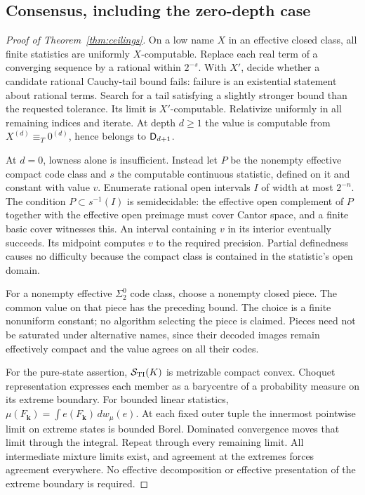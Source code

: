 \subsection{Consensus, including the zero-depth case}
\begin{proof}[Proof of Theorem~\ref{thm:ceilings}]
On a low name $X$ in an effective closed class, all finite statistics
are uniformly $X$-computable. Replace each real term of a converging
sequence by a rational within $2^{-s}$. With $X'$, decide whether a
candidate rational Cauchy-tail bound fails: failure is an existential
statement about rational terms. Search for a tail satisfying a
slightly stronger bound than the requested tolerance. Its limit is
$X'$-computable. Relativize uniformly in all remaining indices and
iterate. At depth $d\geq1$ the value is computable from
$X^{(d)}\equiv_T0^{(d)}$, hence belongs to $\mathsf D_{d+1}$.

At $d=0$, lowness alone is insufficient. Instead let $P$ be the
nonempty effective compact code class and $s$ the computable
continuous statistic, defined on it and constant with value $v$.
Enumerate rational open intervals $I$ of width at most $2^{-n}$.
The condition $P\subset s^{-1}(I)$ is semidecidable: the effective
open complement of $P$ together with the effective open preimage
must cover Cantor space, and a finite basic cover witnesses this.
An interval containing $v$ in its interior eventually succeeds.
Its midpoint computes $v$ to the required precision. Partial
definedness causes no difficulty because the compact class is
contained in the statistic's open domain.

For a nonempty effective $\Sigma^0_2$ code class, choose a nonempty
closed piece. The common value on that piece has the preceding
bound. The choice is a finite nonuniform constant; no algorithm
selecting the piece is claimed. Pieces need not be saturated under
alternative names, since their decoded images remain effectively
compact and the value agrees on all their codes.

For the pure-state assertion, $\mathcal S_{\rm TI}(K)$ is metrizable compact
convex. Choquet representation \cite{choquet} expresses each
member as a barycentre of a probability measure on its extreme
boundary. For bounded linear statistics,
$\mu(F_{\mathbf k})=\int e(F_{\mathbf k})\,dw_\mu(e)$.
At each fixed outer tuple the innermost pointwise limit on extreme
states is bounded Borel. Dominated convergence moves that limit
through the integral. Repeat through every remaining limit.
All intermediate mixture limits exist, and agreement at the
extremes forces agreement everywhere. No effective decomposition
or effective presentation of the extreme boundary is required.


\end{proof}
